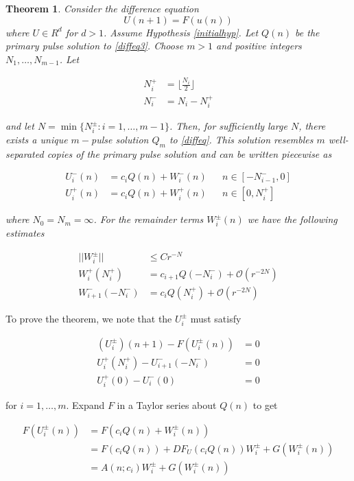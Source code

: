 \documentclass[12pt]{article}
\newtheorem{theorem}{Theorem}
\begin{document}
\begin{theorem}\label{transversemulti}
Consider the difference equation
\begin{equation}\label{diffeq3}
U(n+1) = F(u(n))
\end{equation}
where $U \in R^d$ for $d > 1$. Assume Hypothesis \ref{initialhyp}. Let $Q(n)$ be the primary pulse solution to \eqref{diffeq3}. Choose $m > 1$ and positive integers $N_1, \dots, N_{m-1}$. Let 

\begin{align*}
N_i^+ &= \lfloor \frac{N_i}{2} \rfloor \\
N_i^- &= N_i - N_i^+
\end{align*}

and let $N = \min\{ N_i^\pm : i = 1, \dots, m-1 \}$. Then, for sufficiently large $N$, there exists a unique $m-$pulse solution $Q_m$ to \eqref{diffeq}. This solution resembles $m$ well-separated copies of the primary pulse solution and can be written piecewise as 

\begin{align}
U_i^-(n) &= c_i Q(n) + W_i^-(n) && n \in [-N_{i-1}^-, 0] \\
U_i^+(n) &= c_i Q(n) + W_i^+(n) && n \in [0, N_i^+]
\end{align}

where $N_0 = N_m = \infty$. For the remainder terms $W_i^\pm(n)$ we have the following estimates

\begin{align}
||W_i^\pm|| &\leq C r^{-N} \\
W_i^+(N_i^+) &= c_{i+1} Q(-N_i^-) + \mathcal{O}(r^{-2N}) \\
W_{i+1}^-(-N_i^-) &= c_i Q(N_i^+) + \mathcal{O}(r^{-2N})
\end{align}

\end{theorem}

To prove the theorem, we note that the $U_i^\pm$ must satisfy

\begin{align}
(U_i^\pm)(n+1) - F(U_i^\pm(n)) &= 0 \\
U_i^+(N_i^+) - U_{i+1}^-(-N_i^-) &= 0 \\
U_i^+(0) - U_i^-(0) &= 0
\end{align}

for $i = 1, \dots, m$. Expand $F$ in a Taylor series about $Q(n)$ to get

\begin{align*}
F(U_i^\pm(n)) &= F(c_i Q(n) + W_i^\pm(n)) \\
&= F(c_i Q(n)) + DF_{U}(c_i Q(n)) W_i^\pm + G(W_i^\pm(n)) \\
&= A(n; c_i) W_i^\pm + G(W_i^\pm(n))
\end{align*}
\end{document}
